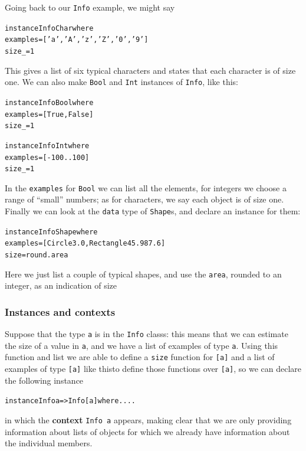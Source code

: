 Going back to our \texttt{Info} example, we might say
\begin{alltt}
instance Info Char where
  examples = ['a','A','z','Z','0','9']
  size _   = 1
\end{alltt}
This gives a list of six typical characters and states that each character is of size one. We can also make \texttt{Bool} and \texttt{Int} instances of \texttt{Info}, like this:
\begin{alltt}
instance Info Bool where
  examples = [True,False]
  size _   = 1
  
instance Info Int where
  examples = [-100..100]
  size _   = 1  
\end{alltt}
In the \texttt{examples} for \texttt{Bool} we can list all the elements, for integers we choose a range of ``small'' numbers; as for characters, we say each object is of size one. Finally we can look at the \texttt{data} type of \texttt{Shape}s, and declare an instance for them:
\begin{alltt}
instance Info Shape where
  examples = [ Circle 3.0, Rectangle 45.9 87.6 ]
  size     = round . area
\end{alltt}
Here we just list a couple of typical shapes, and use the \texttt{area}, rounded to an integer, as an indication of size

\subsubsection*{Instances and contexts}

Suppose that the type \texttt{a} is in the \texttt{Info} classs: this means that
we can estimate the size of a value in
\texttt{a}, and we have a list of examples of type \texttt{a}. Using this function and list we are able to define a \texttt{size} function for \texttt{[a]} and a list of examples of type \texttt{[a]} like thisto define those
functions over \texttt{[a]}, so we can declare the following instance
\begin{alltt}
instance Info a => Info [a] where ....
\end{alltt}
in which the
\textbf{context} \texttt{Info a} appears, making clear that we are only providing information about lists of objects for which we already have information about the individual members.

